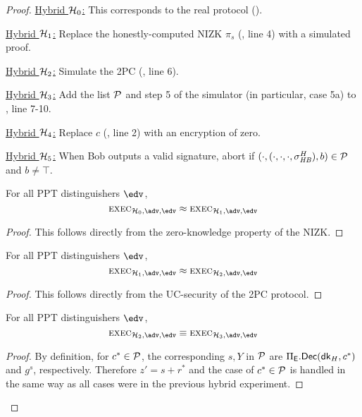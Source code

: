 \begin{proof}
\medskip


\smallskip
\noindent\underline{Hybrid $\mathcal{H}_0$:} This corresponds to the real protocol ().

\smallskip
\noindent\underline{Hybrid $\mathcal{H}_1$:} Replace the honestly-computed NIZK $\pi_s$ (, line 4) with a simulated proof.

\smallskip
\noindent\underline{Hybrid $\mathcal{H}_2$:} Simulate the 2PC (, line 6).

\smallskip
\noindent\underline{Hybrid $\mathcal{H}_3$:} Add the list $\mathcal{P}$ and step 5 of the simulator (in particular, case 5a) to , line 7-10.

\smallskip
\noindent\underline{Hybrid $\mathcal{H}_4$:} Replace $c$ (, line 2) with an encryption of zero.

\smallskip
\noindent\underline{Hybrid $\mathcal{H}_5$:} When Bob outputs a valid signature, abort if $(\cdot,(\cdot,\cdot,\cdot,\sigma_{\mathit{HB}}^H),b) \in \mathcal{P}$ and $b \neq \top$.

\begin{claim}
For all PPT distinguishers $\env$,
\[
    \exec_{\hybrid_0,\adv,\env} \approx \exec_{\hybrid_1,\adv,\env}
\]
\end{claim}
\begin{proof}
This follows directly from the zero-knowledge property  of the NIZK.
\end{proof}

\begin{claim}
For all PPT distinguishers $\env$,
\[
    \exec_{\hybrid_1,\adv,\env} \approx \exec_{\hybrid_2,\adv,\env}
\]
\end{claim}
\begin{proof}
This follows directly from the UC-security of the 2PC protocol.
\end{proof}

\begin{claim}
For all PPT distinguishers $\env$,
\[
    \exec_{\hybrid_2,\adv,\env} \equiv \exec_{\hybrid_3,\adv,\env}
\]
\end{claim}
\begin{proof}
By definition, for $c^* \in \mathcal{P}$, the corresponding $s, Y$ in $\mathcal{P}$ are $\Pi_{\mathsf{E}}.{\mathsf{Dec}}(\mathsf{dk}_H,\allowbreak c^*)$ and $g^s$, respectively. Therefore $z' = s + r^*$ and the case of $c^* \in \mathcal{P}$ is handled in the same way as all cases were in the previous hybrid experiment.
\end{proof}


\end{proof}
